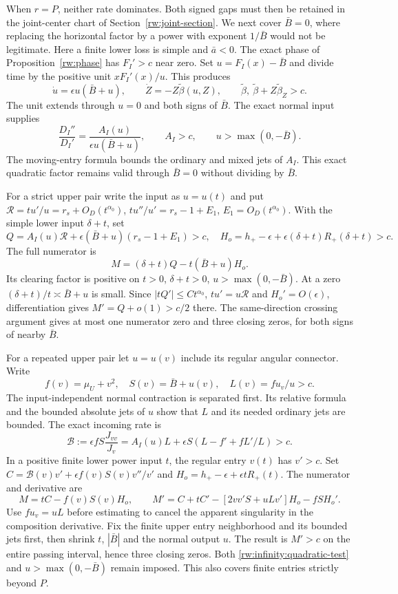 When $r=P$, neither rate dominates. Both signed gaps must then be
retained in the joint-center chart of Section~\ref{rw:joint-section}.
\label{rw:infinity:signed-horizontal}
We next cover $\bar B=0$, where replacing the horizontal factor
by a power with exponent $1/\bar B$ would not be legitimate.
Here a finite lower loss is simple and $\bar a<0$.
The exact phase of Proposition~\ref{rw:phase} has $F_I'>c$ near
zero. Set $u=F_I(x)-\bar B$ and divide time by the positive unit
$xF_I'(x)/u$. This produces
\[
 \dot u=\epsilon u(\bar B+u),\qquad
 \dot Z=-Z\widetilde\beta(u,Z),\qquad
 \widetilde\beta,\ \widetilde\beta+Z\widetilde\beta_Z>c.
\]
The unit extends through $u=0$ and both signs of $\bar B$.
The exact normal input supplies
\[
 \frac{D_I''}{D_I'}=\frac{A_I(u)}{\epsilon u(\bar B+u)},
 \qquad A_I>c,\qquad u>\max(0,-\bar B).
\]
The moving-entry formula bounds the ordinary and mixed jets of
$A_I$. This exact quadratic factor remains valid through
$\bar B=0$ without dividing by $\bar B$.

For a strict upper pair write the input as $u=u(t)$ and put
$\mathcal R=tu'/u=r_s+O_D(t^{\alpha_0})$,
$tu''/u'=r_s-1+E_1$, $E_1=O_D(t^{\alpha_0})$.
With the simple lower input $\delta+t$, set
\[
 Q=A_I(u)\mathcal R+\epsilon(\bar B+u)(r_s-1+E_1)>c,
 \quad H_o=h_+-\epsilon+\epsilon(\delta+t)R_+(\delta+t)>c.
\]
The full numerator is
\[
 M=(\delta+t)Q-t(\bar B+u)H_o.
\]
Its clearing factor is positive on
$t>0$, $\delta+t>0$, $u>\max(0,-\bar B)$.
At a zero $(\delta+t)/t\asymp\bar B+u$ is small. Since
$|tQ'|\le Ct^{\alpha_0}$, $tu'=u\mathcal R$ and
$H_o'=O(\epsilon)$, differentiation gives $M'=Q+o(1)>c/2$
there. The same-direction crossing argument gives at most one numerator
zero and three closing zeros, for both signs of nearby $\bar B$.

For a repeated upper pair let $u=u(v)$ include its regular angular
connector. Write
\[
 f(v)=\mu_U+v^2,\quad S(v)=\bar B+u(v),\quad
 L(v)=fu_v/u>c.
\]
The input-independent normal contraction is separated first.
Its relative formula and the bounded absolute jets of $u$ show that
$L$ and its needed ordinary jets are bounded. The exact incoming rate is
\[
 \mathcal B:=\epsilon fS\frac{J_{vv}}{J_v}
 =A_I(u)L+\epsilon S(L-f'+fL'/L)>c.
\]
In a positive finite lower power input $t$, the regular entry $v(t)$
has $v'>c$. Set
$C=\mathcal B(v)v'+\epsilon f(v)S(v)v''/v'$ and
$H_o=h_+-\epsilon+\epsilon tR_+(t)$. The numerator and derivative are
\[
 M=tC-f(v)S(v)H_o,\qquad
 M'=C+tC'-[2vv'S+uLv']H_o-fS H_o'.
\]
Use $fu_v=uL$ before estimating to cancel the apparent singularity
in the composition derivative. Fix the finite upper entry neighborhood
and its bounded jets first, then shrink $t$, $|\bar B|$ and the
normal output $u$. The result is $M'>c$ on the entire passing
interval, hence three closing zeros. Both
\eqref{rw:infinity:quadratic-test} and $u>\max(0,-\bar B)$ remain
imposed. This also covers finite entries strictly beyond $P$.

